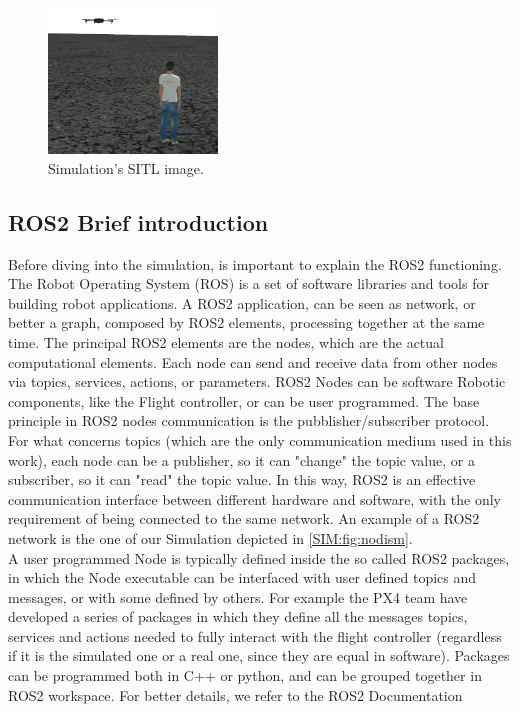 \begin{figure}
    \centering
    \includegraphics[width=0.4\textwidth]{images/screen_simulazione.png}
    \caption{Simulation's SITL image.}
    \label{SOL:fig:screensimulazione}
\end{figure}

\subsection{ROS2 Brief introduction}
Before diving into the simulation, is important to explain the ROS2 functioning. The Robot Operating System (ROS) is a set of software libraries and tools for building robot applications. A ROS2 application, can be seen as network, or better a graph, composed by ROS2 elements, processing together at the same time. The principal ROS2 elements are the nodes, which are the actual computational elements. Each node can send and receive data from other nodes via topics, services, actions, or parameters. ROS2 Nodes can be software Robotic components, like the Flight controller, or can be user programmed. The base principle in ROS2 nodes communication is the pubblisher/subscriber protocol. For what concerns topics (which are the only communication medium used in this work), each node can be a publisher, so it can "change" the topic value, or a subscriber, so it can "read" the topic value. In this way, ROS2 is an effective communication interface between different hardware and software, with the only requirement of being connected to the same network. An example of a ROS2 network is the one of our Simulation depicted in \autoref{SIM:fig:nodism}.\\
A user programmed Node is typically defined inside the so called ROS2 packages, in which the Node executable can be interfaced with user defined topics and messages, or with some defined by others. For example the PX4 team have developed a series of packages in which they define all the messages topics, services and actions needed to fully interact with the flight controller (regardless if it is the simulated one or a real one, since they are equal in software). Packages can be programmed both in C++ or python, and can be grouped together in ROS2 workspace. For better details, we refer to the ROS2 Documentation\cite{ros2doc}

